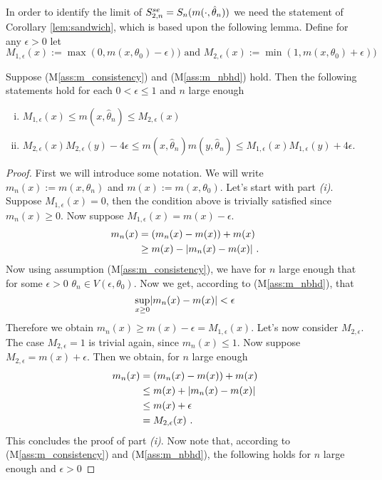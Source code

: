 In order to identify the limit of $S_{2,n}^{se} = S_n(m(\cdot, \hat\theta_n))$ we need the statement of Corollary \ref{lem:sandwich}, which is based upon the following lemma. Define for any $\epsilon >0$ let
$$M_{1,\epsilon}(x) := \max(0, m(x, \theta_0) - \epsilon)) \textrm{ and } M_{2,\epsilon}(x) := \min(1, m(x, \theta_0) + \epsilon))$$
\begin{lemma} 
	Suppose (M\ref{ass:m_consistency}) and (M\ref{ass:m_nbhd}) hold. Then the following statements hold for each $0 < \epsilon \leq 1$ and $n$ large enough
	\begin{enumerate}[(i)]
		\item $M_{1,\epsilon}(x) \leq m(x,\hat\theta_n) \leq M_{2,\epsilon}(x)$
		\item $M_{2,\epsilon}(x)M_{2,\epsilon}(y) - 4\epsilon \leq m(x,\hat\theta_n)m(y,\hat\theta_n) \leq M_{1,\epsilon}(x)M_{1,\epsilon}(y) + 4\epsilon$.
	\end{enumerate}
	\label{lem:Mm}
	\begin{proof}
		First we will introduce some notation. We will write $m_n(x) := m(x,\theta_n)$ and $m(x):= m(x,\theta_0)$. Let's start with part \textit{(i)}. Suppose $M_{1,\epsilon}(x) = 0$, then the condition above is trivially satisfied since $m_n(x) \geq 0$. Now suppose $M_{1,\epsilon}(x) = m(x)-\epsilon$. 
		\begin{align*}
			m_n(x) &= (m_n(x) - m(x)) + m(x)\\
			&\geq m(x) - \lvert m_n(x) - m(x)\rvert \textrm{ .}
		\end{align*}
		Now using assumption (M\ref{ass:m_consistency}), we have for $n$ large enough that for some $\epsilon > 0$ $\theta_n \in V(\epsilon, \theta_0)$. Now we get, according to (M\ref{ass:m_nbhd}), that 
		$$\sup_{x\geq 0}\lvert m_n(x) - m(x)\rvert < \epsilon$$
		Therefore we obtain $m_n(x) \geq m(x) - \epsilon= M_{1,\epsilon}(x)$. Let's now consider $M_{2,\epsilon}$. The case $M_{2,\epsilon} = 1$ is trivial again, since $m_n(x) \leq 1$. Now suppose $M_{2,\epsilon} = m(x) + \epsilon$. Then we obtain, for $n$ large enough
		\begin{align*}
			m_n(x) &= (m_n(x) - m(x)) + m(x)\\
			&\leq m(x) + \lvert m_n(x) - m(x)\rvert\\
			&\leq m(x) + \epsilon\\
			&= M_{2,\epsilon}(x)\textrm{ .}
		\end{align*}
		This concludes the proof of part \textit{(i)}. Now note that, according to (M\ref{ass:m_consistency})  and (M\ref{ass:m_nbhd}), the following holds for $n$ large enough and $\epsilon>0$

\end{proof}
\end{lemma}
